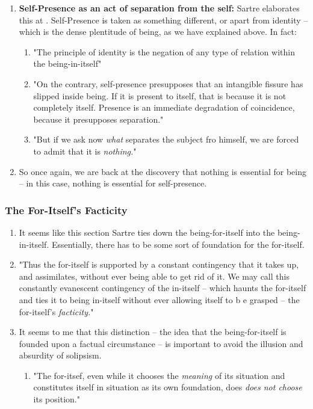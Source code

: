 \begin{enumerate}
\begin{enumerate}
  \end{enumerate}
  \item \textbf{Self-Presence as an act of separation from the self:} Sartre elaborates this at \autocite[127]{sartre}. Self-Presence is taken as something different, or apart from identity -- which is the dense plentitude of being, as we have explained above. In fact:
  \begin{enumerate}
    \item "The principle of identity is the negation of any type of relation within the being-in-itself"
    \item "On the contrary, self-presence presupposes that an intangible fissure has slipped inside being. If it is present to itself, that is because it is not completely itself. Presence is an immediate degradation of coincidence, because it presupposes separation."
    \item "But if we ask now \emph{what} separates the subject fro himself, we are forced to admit that it is \emph{nothing.}" \autocite[127]{sartre}
  \end{enumerate}
  \item So once again, we are back at the discovery that nothing is essential for being -- in this case, nothing is essential for self-presence.
\end{enumerate}

\subsubsection{The For-Itself's Facticity}

\begin{enumerate}
  \item It seems like this section Sartre ties down the being-for-itself into the being-in-itself. Essentially, there has to be some sort of foundation for the for-itself.
  \item "Thus the for-itself is supported by a constant contingency that it takes up, and assimilates, without ever being able to get rid of it. We may call this constantly evanescent contingency of the in-itself -- which haunts the for-itself and ties it to being in-itself without ever allowing itself to b e grasped -- the for-itself's \emph{facticity.}" \autocite[133]{sartre}
  \item It seems to me that this distinction -- the idea that the being-for-itself is founded upon a factual circumstance -- is important to avoid the illusion and absurdity of solipsism.
  \begin{enumerate}
    \item "The for-itsef, even while it chooses the \emph{meaning} of its situation and constitutes itself in situation as its own foundation, does \emph{does not choose} its position." \autocite[134]{sartre}
  \end{enumerate}
\end{enumerate}

